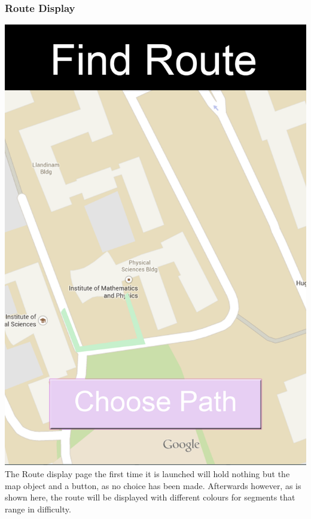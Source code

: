 \subsubsection{Route Display}
\includegraphics[scale=0.6]{Design/Route.png}\\
The Route display page the first time it is launched will hold nothing but the map object and a button, as no choice has been made. Afterwards however, as is shown here, the route will be displayed with different colours for segments that range in difficulty.
